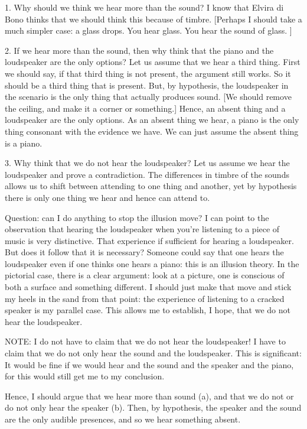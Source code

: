 \documentclass[sloppy, journal, git, bytitle, dodraft]{humapap}
\begin{document}
1. Why should we think we hear more than the sound? I know that Elvira di Bono thinks that we should think this because of timbre. 
[Perhaps I should take a much simpler case: a glass drops. You hear glass. You hear the sound of glass. ]

2. If we hear more than the sound, then why think that the piano and the loudspeaker are the only options? Let us assume that we hear a third thing. First we should say, if that third thing is not present, the argument still works. So it should be a third thing that is present. But, by hypothesis, the loudspeaker in the scenario is the only thing that actually produces sound. [We should remove the ceiling, and make it a corner or something.] Hence, an absent thing and a loudspeaker are the only options. As an absent thing we hear, a piano is the only thing consonant with the evidence we have. We can just assume the absent thing is a piano. 

3. Why think that we do not hear the loudspeaker? Let us assume we hear the loudspeaker and prove a contradiction. The differences in timbre of the sounds allows us to shift between attending to one thing and another, yet by hypothesis there is only one thing we hear and hence can attend to. 

Question: can I do anything to stop the illusion move? I can point to the observation that hearing the loudspeaker when you're listening to a piece of music is very distinctive. That experience if sufficient for hearing a loudspeaker. But does it follow that it is necessary? Someone could say that one hears the loudspeaker even if one thinks one hears a piano: this is an illusion theory. In the pictorial case, there is a clear argument: look at a picture, one is conscious of both a surface and something different. I should just make that move and stick my heels in the sand from that point: the experience of listening to a cracked speaker is my parallel case. This allows me to establish, I hope, that we do not hear the loudspeaker. 

NOTE: I do not have to claim that we do not hear the loudspeaker! I have to claim that we do not only hear the sound and the loudspeaker. This is significant: It would be fine if we would hear and the sound and the speaker and the piano, for this would still get me to my conclusion. 

Hence, I should argue that we hear more than sound (a), and that we do not or do not only hear the speaker (b). Then, by hypothesis, the speaker and the sound are the only audible presences, and so we hear something absent. 
\end{document}
